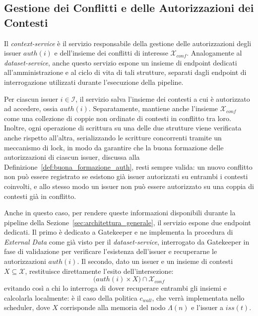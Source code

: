 
\subsection{Gestione dei Conflitti e delle Autorizzazioni dei Contesti}
\label{subsec:context_service}

Il \emph{context-service} è il servizio responsabile della gestione delle autorizzazioni degli issuer $auth(i)$ e dell'insieme dei conflitti di interesse $\mathcal{X}_{conf}$. Analogamente al \emph{dataset-service}, anche questo servizio espone un insieme di endpoint dedicati all'amministrazione e al ciclo di vita di tali strutture, separati dagli endpoint di interrogazione utilizzati durante l'esecuzione della pipeline.

Per ciascun issuer $i \in \mathcal{I}$, il servizio salva l'insieme dei contesti a cui è autorizzato ad accedere, ossia $auth(i)$. Separatamente, mantiene anche l'insieme $\mathcal{X}_{conf}$ come una collezione di coppie non ordinate di contesti in conflitto tra loro. Inoltre, ogni operazione di scrittura su una delle due strutture viene verificata anche rispetto all'altra, serializzando le scritture concorrenti tramite un meccanismo di lock, in modo da garantire che la buona formazione delle autorizzazioni di ciascun issuer, discussa alla Definizione~\ref{def:buona_formazione_auth}, resti sempre valida: un nuovo conflitto non può essere registrato se esistono già issuer autorizzati su entrambi i contesti coinvolti, e allo stesso modo un issuer non può essere autorizzato su una coppia di contesti già in conflitto.

Anche in questo caso, per rendere queste informazioni disponibili durante la pipeline della Sezione~\ref{sec:architettura_generale}, il servizio espone due endpoint dedicati. Il primo è dedicato a Gatekeeper e ne implementa la procedura di \emph{External Data} come già visto per il \emph{dataset-service}, interrogato da Gatekeeper in fase di validazione per verificare l'esistenza dell'issuer e recuperarne le autorizzazioni $auth(i)$. Il secondo, dato un issuer e un insieme di contesti $X \subseteq \mathcal{X}$, restituisce direttamente l'esito dell'intersezione:
\begin{equation}
    \bigl( auth(i) \times X \bigr) \cap \mathcal{X}_{conf}
\end{equation}
evitando così a chi lo interroga di dover recuperare entrambi gli insiemi e calcolarla localmente: è il caso della politica $c_{wall}$, che verrà implementata nello scheduler, dove $X$ corrisponde alla memoria del nodo $\Lambda(n)$ e l'issuer a $iss(t)$.

